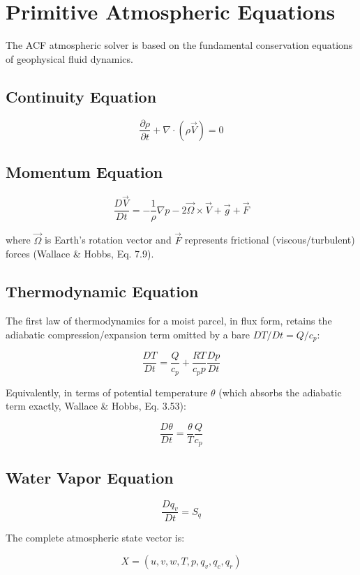 \section{Primitive Atmospheric Equations}


The ACF atmospheric solver is based on the fundamental conservation
equations of geophysical fluid dynamics.



\subsection{Continuity Equation}


\begin{equation}
\frac{\partial \rho}{\partial t}
+
\nabla \cdot (\rho \vec{V})
=
0
\end{equation}



\subsection{Momentum Equation}


\begin{equation}
\frac{D\vec{V}}{Dt}
=
-\frac{1}{\rho}\nabla p
-2\vec{\Omega}\times\vec{V}
+\vec{g}
+\vec{F}
\end{equation}


where $\vec{\Omega}$ is Earth's rotation vector and $\vec{F}$ represents
frictional (viscous/turbulent) forces (Wallace \& Hobbs, Eq. 7.9).



\subsection{Thermodynamic Equation}

The first law of thermodynamics for a moist parcel, in flux form, retains
the adiabatic compression/expansion term omitted by a bare $DT/Dt=Q/c_p$:

\begin{equation}
\frac{DT}{Dt}
=
\frac{Q}{c_p}
+
\frac{RT}{c_p p}\frac{Dp}{Dt}
\end{equation}


Equivalently, in terms of potential temperature $\theta$ (which absorbs the
adiabatic term exactly, Wallace \& Hobbs, Eq. 3.53):

\begin{equation}
\frac{D\theta}{Dt}
=
\frac{\theta}{T}\frac{Q}{c_p}
\end{equation}



\subsection{Water Vapor Equation}


\begin{equation}
\frac{Dq_v}{Dt}
=
S_q
\end{equation}



The complete atmospheric state vector is:


\begin{equation}
X=
(u,v,w,T,p,q_v,q_c,q_r)
\end{equation}

